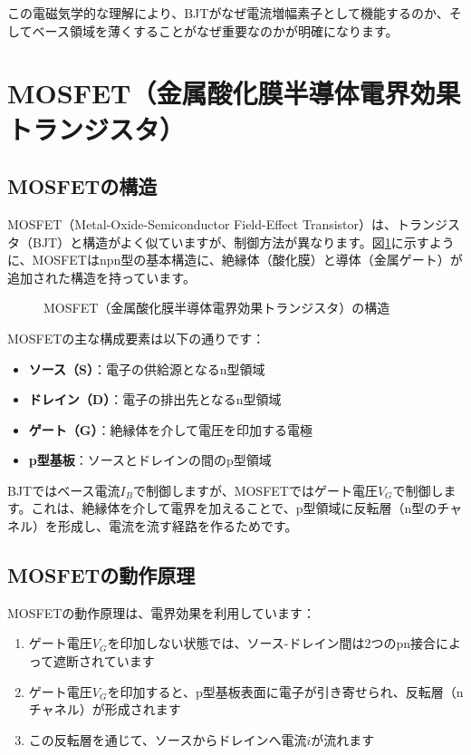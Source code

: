 この電磁気学的な理解により、BJTがなぜ電流増幅素子として機能するのか、そしてベース領域を薄くすることがなぜ重要なのかが明確になります。

\section{MOSFET（金属酸化膜半導体電界効果トランジスタ）}

\subsection{MOSFETの構造}

MOSFET（Metal-Oxide-Semiconductor Field-Effect Transistor）は、トランジスタ（BJT）と構造がよく似ていますが、制御方法が異なります。図\ref{fig:mosfet_structure}に示すように、MOSFETはnpn型の基本構造に、絶縁体（酸化膜）と導体（金属ゲート）が追加された構造を持っています。

\begin{figure}[H]
\centering
{}
\caption{MOSFET（金属酸化膜半導体電界効果トランジスタ）の構造}
\label{fig:mosfet_structure}
\end{figure}

MOSFETの主な構成要素は以下の通りです：

\begin{itemize}
\item \textbf{ソース（S）}：電子の供給源となるn型領域
\item \textbf{ドレイン（D）}：電子の排出先となるn型領域
\item \textbf{ゲート（G）}：絶縁体を介して電圧を印加する電極
\item \textbf{p型基板}：ソースとドレインの間のp型領域
\end{itemize}

BJTではベース電流$I_B$で制御しますが、MOSFETではゲート電圧$V_G$で制御します。これは、絶縁体を介して電界を加えることで、p型領域に反転層（n型のチャネル）を形成し、電流を流す経路を作るためです。

\subsection{MOSFETの動作原理}

MOSFETの動作原理は、電界効果を利用しています：

\begin{enumerate}
\item ゲート電圧$V_G$を印加しない状態では、ソース-ドレイン間は2つのpn接合によって遮断されています
\item ゲート電圧$V_G$を印加すると、p型基板表面に電子が引き寄せられ、反転層（nチャネル）が形成されます
\item この反転層を通じて、ソースからドレインへ電流$i$が流れます
\end{enumerate}

